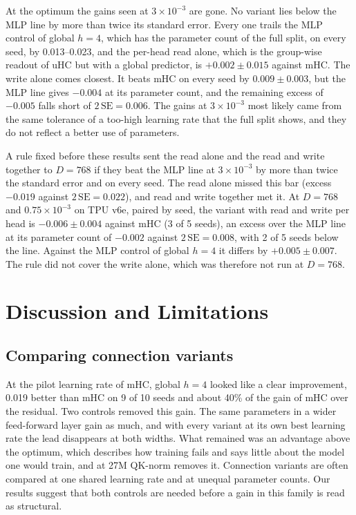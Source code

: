 \documentclass[11pt, a4paper]{article}
\newcommand{\lr}[1]{\ensuremath{#1 \times 10^{-3}}}
\begin{document}
At the optimum the gains seen at \lr{3} are gone. No variant lies below the MLP line by more than twice its standard error. Every
one trails the MLP control of global $h = 4$, which has the parameter count of the full split, on every seed, by 0.013--0.023,
and the per-head read alone, which is the group-wise readout of uHC but with
a global predictor, is $+0.002 \pm 0.015$ against mHC. The write alone comes closest. It beats mHC on every seed by $0.009 \pm
0.003$, but the MLP line gives $-0.004$ at its parameter count, and the remaining excess of $-0.005$ falls short of
$2\,\mathrm{SE} = 0.006$.
The gains at \lr{3} most likely came from the same tolerance of a too-high learning rate that the full split shows, and they do not reflect a
better use of parameters.

A rule fixed before these results sent the read alone and the read and write together to $D = 768$ if they beat the MLP line at
\lr{3} by more than twice the standard error and on every seed. The read alone missed this bar (excess $-0.019$ against
$2\,\mathrm{SE} = 0.022$), and read and write together met it. At $D = 768$ and \lr{0.75} on TPU v6e, paired by seed, the variant with read and write per head is $-0.006 \pm 0.004$ against mHC (3 of 5 seeds), an excess over the
MLP line at its parameter count of $-0.002$ against $2\,\mathrm{SE} = 0.008$, with 2 of 5 seeds below the line. Against the MLP
control of global $h = 4$ it differs by $+0.005 \pm 0.007$. The rule did not cover the write alone, which was therefore not run at $D = 768$.

\section{Discussion and Limitations}
\label{sec:discussion}

\subsection{Comparing connection variants}
\label{sec:lesson}

At the pilot learning rate of mHC, global $h = 4$ looked like a clear improvement, 0.019 better than mHC on 9 of 10 seeds and about
40\% of the gain of mHC over the residual. Two controls removed this gain. The same parameters in a wider feed-forward layer gain
as much, and with every variant at its own best learning rate the lead disappears at both widths. What remained was an advantage
above the optimum, which describes how training fails and says little about the model one would train, and at 27M QK-norm removes it.
Connection variants are often compared at one shared learning rate and at unequal parameter counts. Our results suggest that both
controls are needed before a gain in this family is read as structural.
\end{document}
